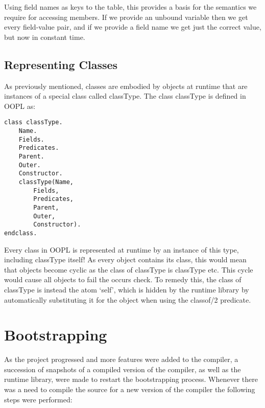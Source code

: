 \documentclass[12pt,a4paper,twoside,openright]{report}
\begin{document}
\bigskip

Using field names as keys to the table, this provides a basis for the semantics we require for accessing members. If we provide an unbound variable then we get every field-value pair, and if we provide a field name we get just the correct value, but now in constant time.

	\subsection{Representing Classes}
	
As previously mentioned, classes are embodied by objects at runtime that are instances of a special class called classType. The class classType is defined in OOPL as:

\begin{lstlisting}
class classType.
	Name.
	Fields.
	Predicates.
	Parent.
	Outer.
	Constructor.
	classType(Name, 
		Fields,
		Predicates,
		Parent,
		Outer,
		Constructor).
endclass.
\end{lstlisting}

Every class in OOPL is represented at runtime by an instance of this type, including classType itself! As every object contains its class, this would mean that objects become cyclic as the class of classType is classType etc. This cycle would cause all objects to fail the occurs check. To remedy this, the class of classType is instead the atom `self', which is hidden by the runtime library by automatically substituting it for the object when using the classof/2 predicate.

\section{Bootstrapping}

As the project progressed and more features were added to the compiler, a succession of snapshots of a compiled version of the compiler, as well as the runtime library, were made to restart the bootstrapping process. Whenever there was a need to compile the source for a new version of the compiler the following steps were performed:
\end{document}
